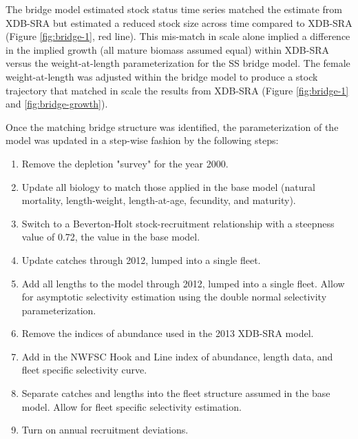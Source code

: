 \documentclass[11pt,
  english,
  a4paper,
]{article}
\begin{document}
\leavevmode\tagmcend\tagstructend\par


The bridge model estimated stock status time series matched the estimate from XDB-SRA but estimated a reduced stock size across time compared to XDB-SRA (Figure \ref{fig:bridge-1}, red line). This mis-match in scale alone implied a difference in the implied growth (all mature biomass assumed equal) within XDB-SRA versus the weight-at-length parameterization for the SS bridge model. The female weight-at-length was adjusted within the bridge model to produce a stock trajectory that matched in scale the results from XDB-SRA (Figure \ref{fig:bridge-1} and \ref{fig:bridge-growth}).

\leavevmode\tagmcend\tagstructend\par


Once the matching bridge structure was identified, the parameterization of the model was updated in a step-wise fashion by the following steps:

\leavevmode\tagmcend\tagstructend\par

\begin{enumerate}
    \item Remove the depletion "survey" for the year 2000.
    \item Update all biology to match those applied in the base model (natural mortality, length-weight, length-at-age, fecundity, and maturity).
    \item Switch to a Beverton-Holt stock-recruitment relationship with a steepness value of 0.72, the value in the base model.
    \item Update catches through 2012, lumped into a single fleet.
    \item Add all lengths to the model through 2012, lumped into a single fleet. Allow for asymptotic selectivity estimation using the double normal selectivity parameterization. 
    \item Remove the indices of abundance used in the 2013 XDB-SRA model.
    \item Add in the NWFSC Hook and Line index of abundance, length data, and fleet specific selectivity curve.
    \item Separate catches and lengths into the fleet structure assumed in the base model. Allow for fleet specific selectivity estimation.  
    \item Turn on annual recruitment deviations.
\end{enumerate}
\end{document}
